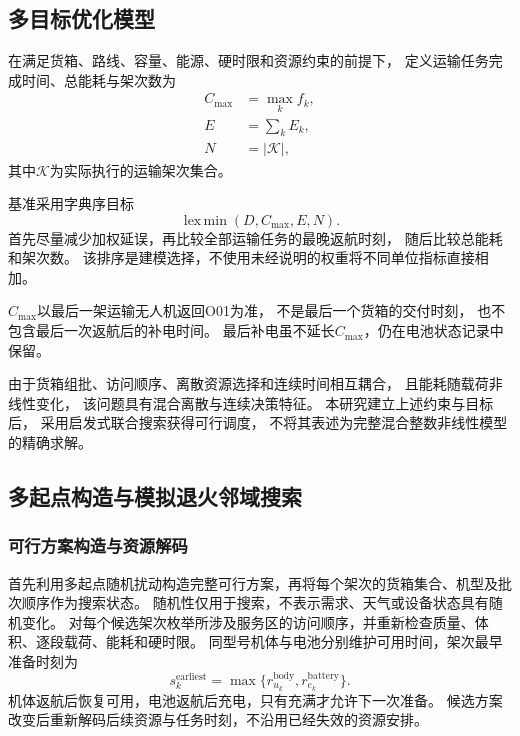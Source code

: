 \documentclass[bwprint]{gmcmthesis}
\begin{document}
\subsection{多目标优化模型}

在满足货箱、路线、容量、能源、硬时限和资源约束的前提下，
定义运输任务完成时间、总能耗与架次数为
\begin{align}
    C_{\max}&=\max_k f_k,\\
    E&=\sum_k E_k,\\
    N&=|\mathcal{K}|,
\end{align}
其中$\mathcal{K}$为实际执行的运输架次集合。

基准采用字典序目标
\begin{equation}
    \operatorname{lex\,min}
    \left(D,C_{\max},E,N\right).
    \label{eq:q2_objective}
\end{equation}
首先尽量减少加权延误，再比较全部运输任务的最晚返航时刻，
随后比较总能耗和架次数。
该排序是建模选择，不使用未经说明的权重将不同单位指标直接相加。

$C_{\max}$以最后一架运输无人机返回O01为准，
不是最后一个货箱的交付时刻，
也不包含最后一次返航后的补电时间。
最后补电虽不延长$C_{\max}$，仍在电池状态记录中保留。

由于货箱组批、访问顺序、离散资源选择和连续时间相互耦合，
且能耗随载荷非线性变化，
该问题具有混合离散与连续决策特征。
本研究建立上述约束与目标后，
采用启发式联合搜索获得可行调度，
不将其表述为完整混合整数非线性模型的精确求解。

\subsection{多起点构造与模拟退火邻域搜索}
\subsubsection{可行方案构造与资源解码}
首先利用多起点随机扰动构造完整可行方案，再将每个架次的货箱集合、机型及批次顺序作为搜索状态。
随机性仅用于搜索，不表示需求、天气或设备状态具有随机变化。
对每个候选架次枚举所涉及服务区的访问顺序，并重新检查质量、体积、逐段载荷、能耗和硬时限。
同型号机体与电池分别维护可用时间，架次最早准备时刻为
\begin{equation}
s_k^{\mathrm{earliest}}=\max\{r_{u_k}^{\mathrm{body}},r_{e_k}^{\mathrm{battery}}\}.
\end{equation}
机体返航后恢复可用，电池返航后充电，只有充满才允许下一次准备。
候选方案改变后重新解码后续资源与任务时刻，不沿用已经失效的资源安排。
\end{document}
